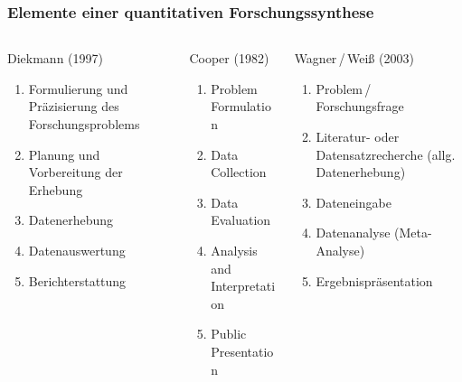 \begin{frame}
  \frametitle{Elemente einer quantitativen Forschungssynthese}
  \begin{small}
    \begin{columns}[t]
      \begin{column}{0.35\linewidth}
        Diekmann (1997)
        \begin{enumerate}
        \item Formulierung und Präzisierung des Forschungsproblems
        \item Planung und Vorbereitung der Erhebung
        \item Datenerhebung
        \item Daten\-auswertung
        \item Berichterstattung
        \end{enumerate}
      \end{column}
      \begin{column}{0.3\linewidth}
        Cooper (1982)
        \begin{enumerate}
        \item Problem Formulation
        \item Data Collection
        \item Data Evaluation
        \item Analysis and Interpretation
        \item Public Presentation
        \end{enumerate}
      \end{column}
      \begin{column}{0.34\linewidth}
        Wagner\,/\,Weiß (2003)
        \begin{enumerate}
        \item Problem\,/\,\\Forschungsfrage
        \item Literatur-\- oder Datensatz\-recherche\- (allg. Datenerhebung)
        \item Dateneingabe
        \item Datenanalyse (Meta-Analyse)
        \item Ergebnis\-präsentation
        \end{enumerate}
      \end{column}
    \end{columns}
  \end{small}
\end{frame}




